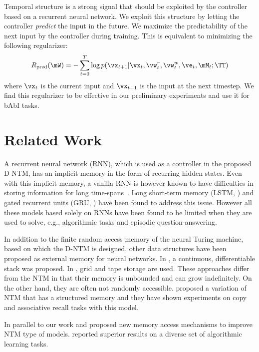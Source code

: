 \documentclass[12pt]{article}
\begin{document}
Temporal structure is a strong signal that should be exploited by the controller based on a recurrent neural network. We exploit this structure by letting the controller {\it predict} the input in the future. We maximize the predictability of the next input by the controller during training. This is equivalent to minimizing the following regularizer:
\[
R_{\text{pred}}(\mW) = -\sum_{t=0}^T\log p(\vx_{t+1}|\vx_t, \vw^r_t, \vw^w_t, \ve_t, \mM_t; \TT)
\]
where $\vx_t$ is the current input and $\vx_{t+1}$ is the input at the next timestep. We find this regularizer to be effective in our preliminary experiments and use it for bAbI tasks.

\section{Related Work}

A recurrent neural network (RNN), which is used as a controller in the proposed
D-NTM, has an implicit memory in the form of recurring hidden states. Even with
this implicit memory, a vanilla RNN is however known to have difficulties in
storing information for long time-spans~\citep{bengio1994learning,hochreiter1991untersuchungen}. Long short-term memory
(LSTM, \citep{lstm1997}) and gated recurrent units (GRU, \citep{cho2014learning})
have been found to address this issue. However all these models based solely on
RNNs have been found to be limited when they are used to solve, e.g.,
algorithmic tasks and episodic question-answering. 

In addition to the finite random access memory of the neural Turing machine,
based on which the D-NTM is designed, other data structures have been proposed
as external memory for neural networks. In \citep{sun1997neural,grefenstette2015learning,joulin2015inferring}, a continuous,
differentiable stack was proposed. In \citep{zaremba2015learning,rlntm}, grid and
tape storage are used. These approaches differ from the NTM in that their
memory is unbounded and can grow indefinitely. On the other hand, they are
often not randomly accessible. \cite{zhang2015structured} proposed a variation of NTM
that has a structured memory and they have shown experiments on copy and associative
recall tasks with this model.

In parallel to our work \citep{yang2016lie} and \citep{graves2016hybrid} proposed
new memory access mechanisms to improve NTM type of models. \citep{graves2016hybrid}
reported superior results on a diverse set of algorithmic learning tasks.
\end{document}
